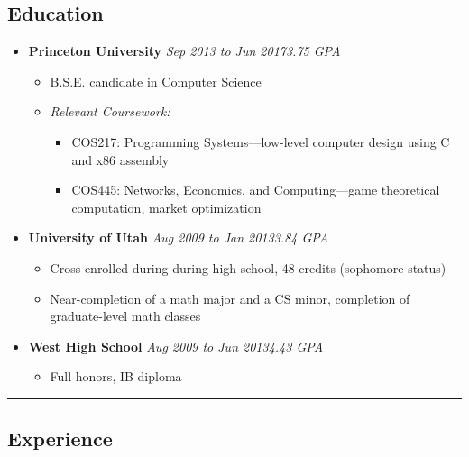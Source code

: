 \documentclass[11pt]{article}
\begin{document}
\subsection*{\textbf{Education}}
\begin{itemize}[nolistsep,topsep=0pt, label=]
\itemsep0.33em

\item \textbf{Princeton University} \emph{Sep 2013 to Jun 2017}\hfill \emph{3.75 GPA}
\begin{itemize}[nolistsep,topsep=0pt, label=]
\item B.S.E. candidate in Computer Science
\item \emph{Relevant Coursework:}
\begin{itemize}[nolistsep,topsep=0pt, label=]
\item {COS217:} Programming Systems---low-level computer design using C and x86 assembly
\item {COS445:} Networks, Economics, and Computing---game theoretical computation, market optimization
\end{itemize}
\end{itemize}

\item \textbf{University of Utah} \emph{Aug 2009 to Jan 2013}\hfill \emph{3.84 GPA}
\begin{itemize}[nolistsep,topsep=0pt, label=]
\item Cross-enrolled during during high school, 48 credits (sophomore status)
\item Near-completion of a math major and a CS minor, completion of graduate-level math classes
\end{itemize}

\item \textbf{West High School} \emph{Aug 2009 to Jun 2013}\hfill \emph{4.43 GPA}
\begin{itemize}[nolistsep,topsep=0pt, label=]
\item Full honors, IB diploma
\end{itemize}
\end{itemize}
\vspace{0.4em}
\hrule
\vspace{-1em}
\subsection*{\textbf{Experience}}
\end{document}
